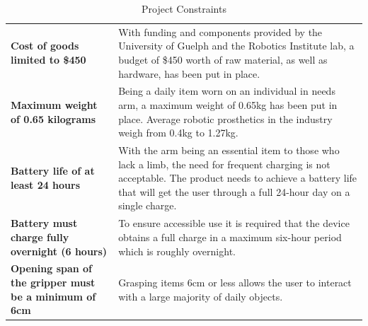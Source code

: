 \documentclass[11.5pt]{article}
\begin{document}
\begin{table}[H]
\centering
\caption{Project Constraints}
\vspace{3mm}
\begin{tabular}{|>{\arraybackslash}m{7.5cm}|>{\arraybackslash}m{7.5cm}|}
\hline
    \multicolumn{1}{|c|}{Constraint}  & \multicolumn{1}{c|}{Description} \\ \hline
      \textbf{Cost of goods limited to \$450} & With funding and components provided by the University of Guelph and the Robotics Institute lab, a budget of \$450 worth of raw material, as well as hardware, has been put in place. \\\hline
    
    \textbf{Maximum weight of 0.65 kilograms} & Being a daily item worn on an individual in needs arm, a maximum weight of 0.65kg has been put in place. Average robotic prosthetics in the industry weigh from 0.4kg to 1.27kg.  \\\hline
    
    \textbf{Battery life of at least 24 hours} & With the arm being an essential item to those who lack a limb, the need for frequent charging is not acceptable. The product needs to achieve a battery life that will get the user through a full 24-hour day on a single charge. \\\hline
    
    \textbf{Battery must charge fully overnight (6 hours)} & To ensure accessible use it is required that the device obtains a full charge in a maximum six-hour period which is roughly overnight.\\\hline
    
    
     \textbf{Opening span of the gripper must be a minimum of 6cm} & Grasping items 6cm or less allows the user to interact with a large majority of daily objects. \\\hline  
    
\end{tabular}
\label{tab:constraints}
\end{table}
\end{document}
